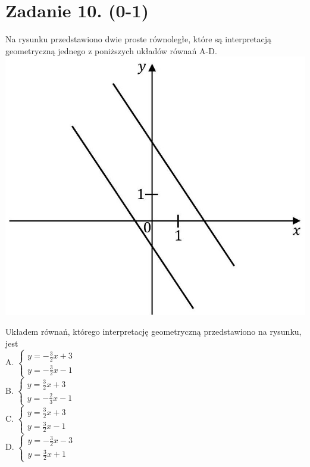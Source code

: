 \documentclass[10pt]{article}
\begin{document}
\section*{Zadanie 10. (0-1)}
Na rysunku przedstawiono dwie proste równoległe, które są interpretacją geometryczną jednego z poniższych układów równań A-D.\\
\includegraphics[max width=\textwidth, center]{2024_11_21_0a35d272448d5080a489g-08}

Układem równań, którego interpretację geometryczną przedstawiono na rysunku, jest\\
A. \(\left\{\begin{array}{l}y=-\frac{3}{2} x+3 \\ y=-\frac{3}{2} x-1\end{array}\right.\)\\
B. \(\left\{\begin{array}{l}y=\frac{3}{2} x+3 \\ y=-\frac{2}{3} x-1\end{array}\right.\)\\
C. \(\left\{\begin{array}{l}y=\frac{3}{2} x+3 \\ y=\frac{3}{2} x-1\end{array}\right.\)\\
D. \(\left\{\begin{array}{l}y=-\frac{3}{2} x-3 \\ y=\frac{3}{2} x+1\end{array}\right.\)
\end{document}
